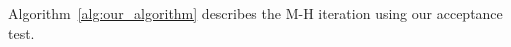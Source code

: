 \documentclass{article}
\begin{document}


Algorithm~\ref{alg:our_algorithm} describes the M-H iteration using our acceptance test.

\end{document}
